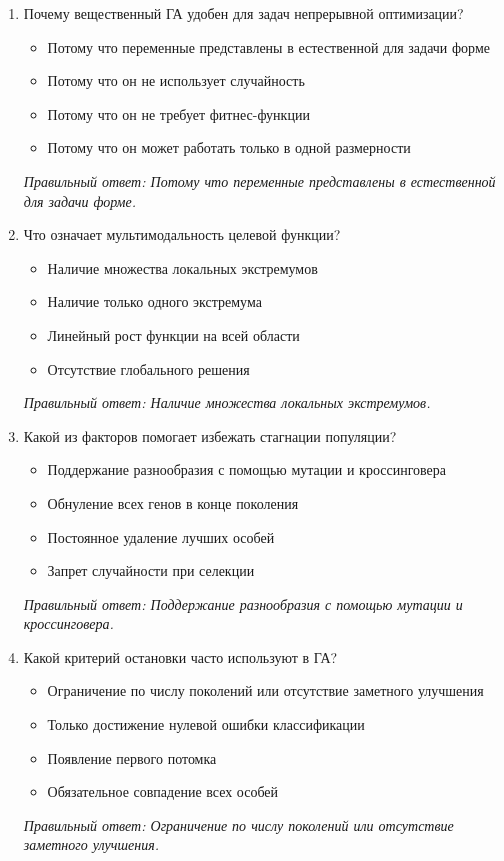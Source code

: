 \begin{enumerate}[label=\textbf{\arabic*.}, leftmargin=0pt, itemsep=1.2em]
\item Почему вещественный ГА удобен для задач непрерывной оптимизации?
\begin{itemize}[label=$\square$, leftmargin=1.5cm, itemsep=0.2em, topsep=0.3em]
\item Потому что переменные представлены в естественной для задачи форме
\item Потому что он не использует случайность
\item Потому что он не требует фитнес-функции
\item Потому что он может работать только в одной размерности
\end{itemize}
{\small\textit{Правильный ответ: Потому что переменные представлены в естественной для задачи форме.}}

\item Что означает мультимодальность целевой функции?
\begin{itemize}[label=$\square$, leftmargin=1.5cm, itemsep=0.2em, topsep=0.3em]
\item Наличие множества локальных экстремумов
\item Наличие только одного экстремума
\item Линейный рост функции на всей области
\item Отсутствие глобального решения
\end{itemize}
{\small\textit{Правильный ответ: Наличие множества локальных экстремумов.}}

\item Какой из факторов помогает избежать стагнации популяции?
\begin{itemize}[label=$\square$, leftmargin=1.5cm, itemsep=0.2em, topsep=0.3em]
\item Поддержание разнообразия с помощью мутации и кроссинговера
\item Обнуление всех генов в конце поколения
\item Постоянное удаление лучших особей
\item Запрет случайности при селекции
\end{itemize}
{\small\textit{Правильный ответ: Поддержание разнообразия с помощью мутации и кроссинговера.}}

\item Какой критерий остановки часто используют в ГА?
\begin{itemize}[label=$\square$, leftmargin=1.5cm, itemsep=0.2em, topsep=0.3em]
\item Ограничение по числу поколений или отсутствие заметного улучшения
\item Только достижение нулевой ошибки классификации
\item Появление первого потомка
\item Обязательное совпадение всех особей
\end{itemize}
{\small\textit{Правильный ответ: Ограничение по числу поколений или отсутствие заметного улучшения.}}


\end{enumerate}
